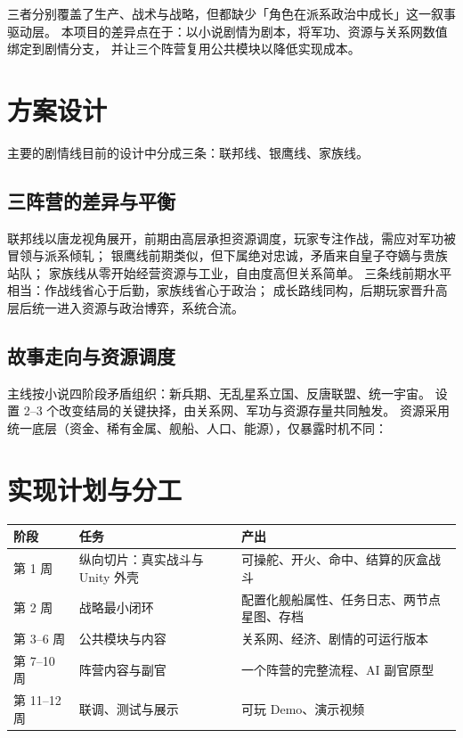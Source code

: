 \documentclass[UTF8,a4paper,11pt]{ctexart}
\begin{document}
三者分别覆盖了生产、战术与战略，但都缺少「角色在派系政治中成长」这一叙事驱动层。
本项目的差异点在于：以小说剧情为剧本，将军功、资源与关系网数值绑定到剧情分支，
并让三个阵营复用公共模块以降低实现成本。

\section{方案设计}
主要的剧情线目前的设计中分成三条：联邦线、银鹰线、家族线。
\subsection{三阵营的差异与平衡}
联邦线以唐龙视角展开，前期由高层承担资源调度，玩家专注作战，需应对军功被冒领与派系倾轧；
银鹰线前期类似，但下属绝对忠诚，矛盾来自皇子夺嫡与贵族站队；
家族线从零开始经营资源与工业，自由度高但关系简单。
三条线前期水平相当：作战线省心于后勤，家族线省心于政治；
成长路线同构，后期玩家晋升高层后统一进入资源与政治博弈，系统合流。

\subsection{故事走向与资源调度}
主线按小说四阶段矛盾组织：新兵期、无乱星系立国、反唐联盟、统一宇宙。
设置 2--3 个改变结局的关键抉择，由关系网、军功与资源存量共同触发。
资源采用统一底层（资金、稀有金属、舰船、人口、能源），仅暴露时机不同：

\section{实现计划与分工}

\begin{table}[h]
\centering
\small
\begin{tabular}{l l l}
\toprule
阶段 & 任务 & 产出 \\
\midrule
第 1 周 & 纵向切片：真实战斗与 Unity 外壳 & 可操舵、开火、命中、结算的灰盒战斗 \\
第 2 周 & 战略最小闭环 & 配置化舰船属性、任务日志、两节点星图、存档 \\
第 3--6 周 & 公共模块与内容 & 关系网、经济、剧情的可运行版本 \\
第 7--10 周 & 阵营内容与副官 & 一个阵营的完整流程、AI 副官原型 \\
第 11--12 周 & 联调、测试与展示 & 可玩 Demo、演示视频 \\
\bottomrule
\end{tabular}
\end{table}
\end{document}
